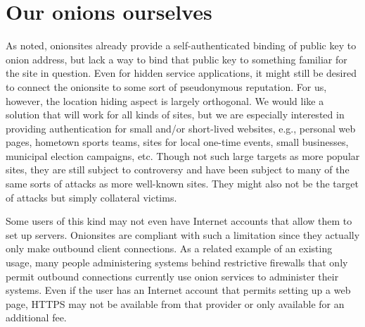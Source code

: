 \documentclass[10pt, conference, compsocconf]{styles/IEEEtran}
\begin{document}



% 
% 
% 



\section{Our onions ourselves}

As noted, onionsites already provide a self-authenticated binding of
public key to onion address, but lack a way to bind that public key to
something familiar for the site in question.  Even for hidden
service applications, it might still be desired to connect the
onionsite to some sort of pseudonymous reputation.  For us, however,
the location hiding aspect is largely orthogonal.  We would like a solution
that will work for all kinds of sites, but we are especially
interested in providing authentication for small and/or short-lived
websites, e.g., personal web pages, hometown sports teams, sites for
local one-time events, small businesses, municipal election campaigns,
etc.  Though not such large targets as more popular sites, they are
still subject to controversy and have been subject to many of the same
sorts of attacks as more well-known sites.  They might also not be
the target of attacks but simply collateral victims. 

Some users of this kind may not even have Internet accounts that allow 
them to set up servers. Onionsites are compliant with such a limitation
since they actually only make outbound client connections. As a related
example of an existing usage, many people administering systems
behind restrictive firewalls that only permit outbound connections
currently use onion services to administer their systems.  Even if the
user has an Internet account that permits setting up a web page, HTTPS
may not be available from that provider or only available for an
additional fee.
\end{document}
